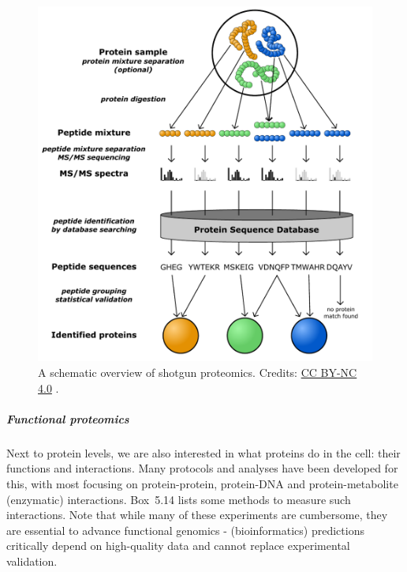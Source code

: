 \begin{figure}[!htbp]
\centering
\includegraphics[width=0.7\linewidth]{files/shotgun-proteomics_a-8030910a3755a6cc3057d2e5f5162fc9.pdf}
\caption[]{A schematic overview of shotgun proteomics.
Credits: \href{https://creativecommons.org/licenses/by/4.0/}{CC BY-NC 4.0} \cite{own_5_2024}.}
\label{shotgun_proteomics_alt}
\end{figure}

\subparagraph{Functional proteomics}

Next to protein levels, we are also interested in what proteins do in the
cell: their functions and interactions. Many protocols and analyses have
been developed for this, with most focusing on protein-protein, protein-DNA
and protein-metabolite (enzymatic) interactions. Box~5.14 lists some methods to
measure such interactions. Note that while many of these experiments are
cumbersome, they are essential to advance functional genomics -
(bioinformatics) predictions critically depend on high-quality data and
cannot replace experimental validation.

